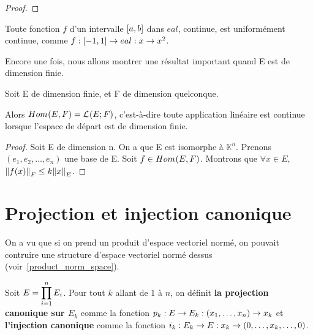 \ifdefined\outputproof
\begin{proof}

\end{proof}
\fi

\begin{exemple}
	Toute fonction $f$ d'un intervalle $\left[a, b\right]$ dans $
eal$, continue, est
	uniformément continue, comme
	$f : \left[-1, 1\right] \rightarrow 
eal : x \rightarrow x^2$.
\end{exemple}

Encore une fois, nous allons montrer une résultat important quand E est de
dimension finie.

\begin{proposition}
	Soit E de dimension finie, et F de dimension quelconque.

	Alors $Hom_{}(E, F) = \mathcal{L}_{}(E; F)$, c'est-à-dire toute
	application linéaire est continue lorsque l'espace de départ est de
	dimension finie.
\end{proposition}

\ifdefined\outputproof
\begin{proof}
	Soit E de dimension n.
	On a que E est isomorphe à $\mathbb{K}^{n}$. Prenons $(e_{1}, e_{2}, \ldots,
	e_{n})$ une base de E.
	Soit $f \in Hom_{}(E, F)$. Montrons que $\forall x \in E$,
	$\norm{f(x)}_{F} \leq k\norm{x}_{E}$.
\end{proof}
\fi

\section{Projection et injection canonique}

On a vu que si on prend un produit d'espace vectoriel normé, on pouvait
contruire une structure d'espace vectoriel normé dessus (voir~\ref{product_norm_space}).


\begin{definition} 
	\label{injection_projection_definition}
	Soit $E =  \displaystyle \prod_{i = 1}^{n} E_{i}$.
	Pour tout $k$ allant de $1$ à $n$, on définit \textbf{la projection
		canonique sur $E_{k}$} comme la fonction
		$p_{k} : E \rightarrow E_{k} : (x_{1}, \ldots, x_{n}) \rightarrow
		x_{k}$ et \textbf{l'injection canonique}
		comme la fonction $i_{k} : E_{k} \rightarrow E : x_{k}
		\rightarrow (0, \ldots, x_{k}, \ldots, 0)$.
\end{definition}

